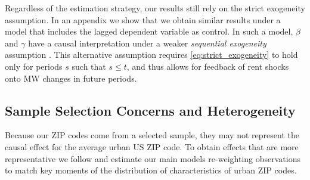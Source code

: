 Regardless of the estimation strategy, our results still rely on the 
strict exogeneity assumption.
In an appendix we show that we obtain similar results under a model that 
includes the lagged dependent variable as control.
In such a model, $\beta$ and $\gamma$ have a causal interpretation under a 
weaker \textit{sequential exogeneity} assumption
\parencite{ArellanoBond1991, ArellanoHonore2001}.
This alternative assumption requires \eqref{eq:strict_exogeneity} to hold
only for periods $s$ such that $s \leq t$, and thus allows for feedback of 
rent shocks onto MW changes in future periods.


\subsection{Sample Selection Concerns and Heterogeneity}\label{sec:emp_start_heterogeneity}

Because our ZIP codes come from a selected sample, they may not represent
the causal effect for the average urban US ZIP code.
To obtain effects that are more representative we follow 
\textcite{Hainmueller2012} and estimate our main models re-weighting 
observations to match key moments of the distribution of characteristics of 
urban ZIP codes.

